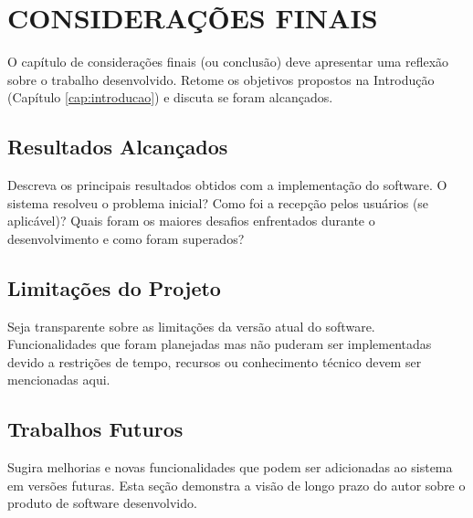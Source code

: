 \chapter{CONSIDERAÇÕES FINAIS}
\label{cap:consideracoes}

O capítulo de considerações finais (ou conclusão) deve apresentar uma reflexão sobre o trabalho desenvolvido. Retome os objetivos propostos na Introdução (Capítulo \ref{cap:introducao}) e discuta se foram alcançados.

\section{Resultados Alcançados}

Descreva os principais resultados obtidos com a implementação do software. O sistema resolveu o problema inicial? Como foi a recepção pelos usuários (se aplicável)? Quais foram os maiores desafios enfrentados durante o desenvolvimento e como foram superados?

\section{Limitações do Projeto}

Seja transparente sobre as limitações da versão atual do software. Funcionalidades que foram planejadas mas não puderam ser implementadas devido a restrições de tempo, recursos ou conhecimento técnico devem ser mencionadas aqui.

\section{Trabalhos Futuros}

Sugira melhorias e novas funcionalidades que podem ser adicionadas ao sistema em versões futuras. Esta seção demonstra a visão de longo prazo do autor sobre o produto de software desenvolvido.
